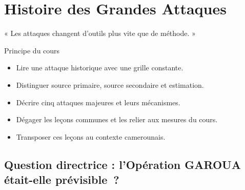 
\chapter{Histoire des Grandes Attaques}
\label{chap:attaques}

\epigraph{%
    « Les attaques changent d'outils plus vite que de méthode. »%
}{Principe du cours}


\begin{boxobjectifs}
\begin{itemize}
    \item Lire une attaque historique avec une grille constante.
    \item Distinguer source primaire, source secondaire et estimation.
    \item Décrire cinq attaques majeures et leurs mécanismes.
    \item Dégager les leçons communes et les relier aux mesures du cours.
    \item Transposer ces leçons au contexte camerounais.
\end{itemize}
\end{boxobjectifs}

\bigskip

\section*{Question directrice : l'Opération GAROUA était-elle prévisible~?}


